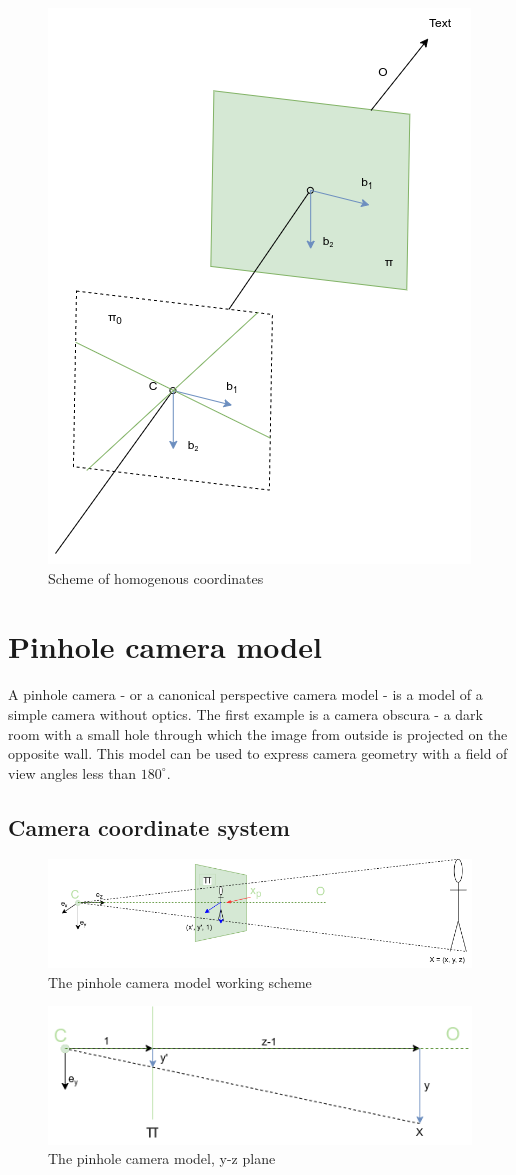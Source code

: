 \begin{figure}[h]
    \centering
    \includegraphics[width=.5\textwidth]{graphics/homogenous.png}
    \caption{Scheme of homogenous coordinates}
    \label{fig:homogenous}
\end{figure}

\section{Pinhole camera model}
A pinhole camera - or a canonical perspective camera model - is a model of a simple camera without optics.
The first example is a camera obscura - a dark room with a small hole through which the image from outside is projected on the opposite wall. 
This model can be used to express camera geometry with a field of view angles less than $180^{\circ}$.

\subsection{Camera coordinate system}
\begin{figure}[h]
    \centering
    \includegraphics[width=1\textwidth]{graphics/td_scene.png}
    \caption{The pinhole camera model working scheme}
    \label{fig:td_scene_3d}
\end{figure}

\begin{figure}[h]
    \centering
    \includegraphics[width=1\textwidth]{graphics/td_scene_yz.png}
    \caption{The pinhole camera model, y-z plane}
    \label{fig:td_scene_yz}
\end{figure}

